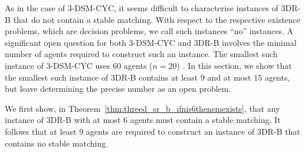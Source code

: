 As in the case of 3-DSM-CYC, it seems difficult to characterise instances of 3DR-B that do not contain a stable matching. With respect to the respective existence problems, which are decision problems, we call such instances ``no'' instances. A significant open question for both 3-DSM-CYC and 3DR-B involves the minimal number of agents required to construct such an instance. The smallest such instance of 3-DSM-CYC uses $60$ agents ($n = 20$) \cite{Lerner22}. In this section, we show that the smallest such instance of 3DR-B contains at least $9$ and at most $15$ agents, but leave determining the precise number as an open problem.

We first show, in Theorem~\ref{thm:threed_sr_b_ifnis6thensmexists}, that any instance of 3DR-B with at most $6$ agents must contain a stable matching. It follows that at least $9$ agents are required to construct an instance of 3DR-B that contains no stable matching.

